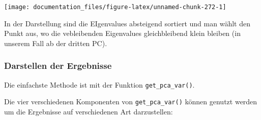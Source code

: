 \documentclass[
]{article}
\newenvironment{Shaded}{\begin{snugshade}}{\end{snugshade}}
\newcommand{\DocumentationTok}[1]{\textcolor[rgb]{0.56,0.35,0.01}{\textbf{\textit{#1}}}}
\newcommand{\FunctionTok}[1]{\textcolor[rgb]{0.00,0.00,0.00}{#1}}
\newcommand{\NormalTok}[1]{#1}
\newcommand{\OtherTok}[1]{\textcolor[rgb]{0.56,0.35,0.01}{#1}}
\begin{document}
\begin{center}\texttt{[image: documentation\_files/figure-latex/unnamed-chunk-272-1]} \end{center}

In der Darstellung sind die EIgenvalues absteigend sortiert und man wählt den Punkt aus, wo die vebleibenden Eigenvalues gleichbleibend klein bleiben (in unserem Fall ab der dritten PC).

\hypertarget{darstellen-der-ergebnisse}{%
\subsubsection{Darstellen der Ergebnisse}\label{darstellen-der-ergebnisse}}

Die einfachste Methode ist mit der Funktion \texttt{get\_pca\_var()}.

\begin{Shaded}
\end{Shaded}

Die vier verschiedenen Komponenten von \texttt{get\_pca\_var()} können genutzt werden um die Ergebnisse auf verschiedenen Art darzustellen:
\end{document}
